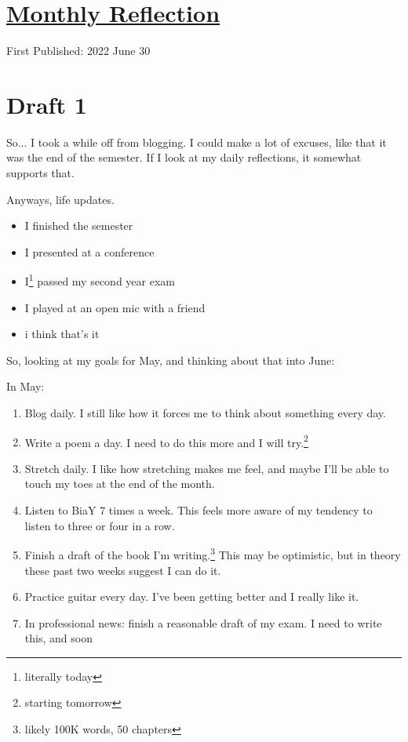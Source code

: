 \documentclass[12pt]{article}[titlepage]
\renewcommand{\,}{\textsuperscript{,}}
\begin{document}
\doublespacing
\section{\href{reflection-june-22.html}{Monthly Reflection}}
First Published: 2022 June 30

\section{Draft 1}
So... I took a while off from blogging.
I could make a lot of excuses, like that it was the end of the semester.
If I look at my daily reflections, it somewhat supports that.

Anyways, life updates.

\begin{itemize}
\item I finished the semester
\item I presented at a conference
\item I\footnote{literally today} passed my second year exam
\item I played at an open mic with a friend
\item i think that's it
\end{itemize}

So, looking at my goals for May, and thinking about that into June:

In May:
\begin{enumerate}
\item Blog daily. I still like how it forces me to think about something every day.
\item Write a poem a day. I need to do this more and I will try.\footnote{starting tomorrow}
\item Stretch daily. I like how stretching makes me feel, and maybe I'll be able to touch my toes at the end of the month.
\item Listen to BiaY 7 times a week. This feels more aware of my tendency to listen to three or four in a row.
\item Finish a draft of the book I'm writing.\footnote{likely 100K words, 50 chapters} This may be optimistic, but in theory these past two weeks suggest I can do it.
\item Practice guitar every day. I've been getting better and I really like it.
\item In professional news: finish a reasonable draft of my exam. I need to write this, and soon
\end{enumerate}
\end{document}
